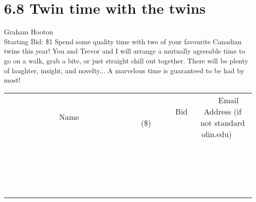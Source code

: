 \documentclass[11pt]{article}
\begin{document}
\section*{6.8 Twin time with the twins}
Graham Hooton
\\
Starting Bid: \$1
\newline
Spend some quality time with two of your favourite Canadian twins this year! You and Trevor and I will arrange a mutually agreeable time to go on a walk, grab a bite, or just straight chill out together. There will be plenty of laughter, insight, and novelty... A marvelous time is guaranteed to be had by most!
\\[3ex]
\begin{tabular}{c c c}
~~~~~~~~~~~~~Name~~~~~~~~~~~~~ & ~~~~~~~~~Bid (\$)~~~~~~~~~  & ~~~Email Address (if not standard olin.edu)~~~\\
 & & \\
\hline
 & & \\
\hline
 & & \\
\hline
 & & \\
\hline
 & & \\
\hline
 & & \\
\hline
 & & \\
\hline
 & & \\
\hline
 & & \\
\hline
 & & \\
\hline
 & & \\
\hline
 & & \\
\hline
 & & \\
\hline
 & & \\
\hline
 & & \\
\hline
 & & \\
\hline
 & & \\
\hline
 & & \\
\hline
 & & \\
\hline
\end{tabular}
\newpage
\end{document}
